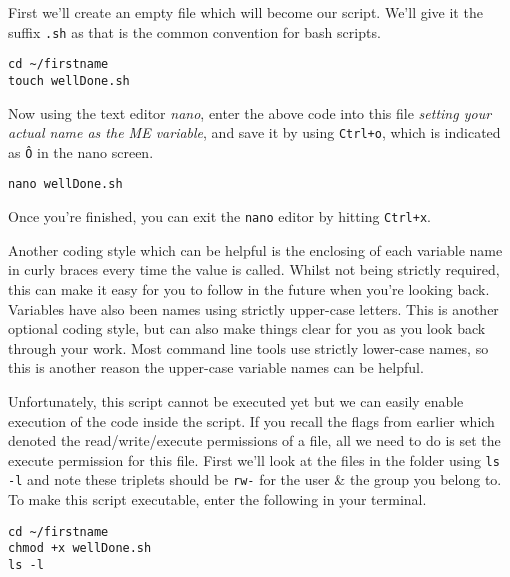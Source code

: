 \begin{steps}
First we'll create an empty file which will become our script.
We'll give it the suffix \texttt{.sh} as that is the common convention for bash scripts.
\end{steps}
\begin{lstlisting}
cd ~/firstname
touch wellDone.sh
\end{lstlisting}

\begin{steps}
Now using the text editor \textit{nano}, enter the above code into this file \textit{setting your
actual name as the ME variable},  and save it by using \texttt{Ctrl+o}, which is indicated as
\texttt{\^O} in the nano screen.\\
\end{steps}

\begin{lstlisting}
nano wellDone.sh
\end{lstlisting}

Once you're finished, you can exit the \texttt{nano} editor by hitting \texttt{Ctrl+x}.

\begin{information}

Another coding style which can be helpful is the enclosing of each variable name in curly braces
every time the value is called.
Whilst not being strictly required, this can make it easy for you to follow in the future when
you're looking back.
Variables have also been names using strictly upper-case letters.
This is another optional coding style, but can also make things clear for you as you look back
through your work.
Most command line tools use strictly lower-case names, so this is another reason the upper-case
variable names can be helpful.
\end{information}

\begin{steps}
Unfortunately, this script cannot be executed yet but we can easily enable execution of the code
inside the script.
If you recall the flags from earlier which denoted the read/write/execute permissions of a file, all
we need to do is set the execute permission for this file.
First we'll look at the files in the folder using \texttt{ls -l} and note these triplets should be
\texttt{rw-} for the user \& the group you belong to.
To make this script executable, enter the following in your terminal.
\begin{lstlisting}
cd ~/firstname
chmod +x wellDone.sh
ls -l
\end{lstlisting}
\end{steps}

